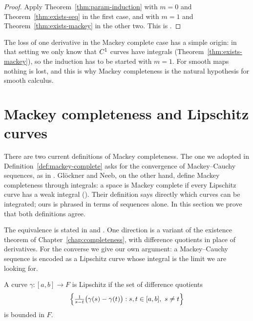 \begin{proof}
  \leanok
  Apply Theorem~\ref{thm:param-induction} with $m = 0$ and Theorem~\ref{thm:exists-seq} in the
  first case, and with $m = 1$ and Theorem~\ref{thm:exists-mackey} in the other two. This is
  \cite[1.3.23]{GN26}.
\end{proof}

\begin{remark}
  The loss of one derivative in the Mackey complete case has a simple origin: in that setting
  we only know that $C^{1}$ curves have integrals (Theorem~\ref{thm:exists-mackey}), so the
  induction has to be started with $m = 1$. For smooth maps nothing is lost, and this is why
  Mackey completeness is the natural hypothesis for smooth calculus.
\end{remark}


\section{Mackey completeness and Lipschitz curves}
\label{sec:mackey-lipschitz}

There are two current definitions of Mackey completeness. The one we adopted in
Definition~\ref{def:mackey-complete} asks for the convergence of Mackey--Cauchy sequences, as
in \cite[2.2]{KM97}. Glöckner and Neeb, on the other hand, define Mackey completeness through
integrals: a space is Mackey complete if every Lipschitz curve has a weak integral
(\cite[1.1.17(b)]{GN26}). Their definition says directly which curves can be integrated; ours is
phrased in terms of sequences alone. In this section we prove that both definitions agree.

The equivalence is stated in \cite[1.1.18(e)]{GN26} and \cite[2.14]{KM97}. One direction is a variant
of the existence theorem of Chapter~\ref{chap:completeness}, with difference quotients in place
of derivatives. For the converse we give our own argument: a Mackey--Cauchy sequence is encoded
as a Lipschitz curve whose integral is the limit we are looking for.

\begin{definition}
  \label{def:lipschitz}
  \leanok
  A curve $\gamma \colon [a, b] \to F$ is Lipschitz if the set of difference quotients
  \[
    \Bigl\{ \tfrac{1}{s - t}\bigl(\gamma(s) - \gamma(t)\bigr) : s, t \in [a, b],\ s \neq t \Bigr\}
  \]
  is bounded in $F$.
\end{definition}

